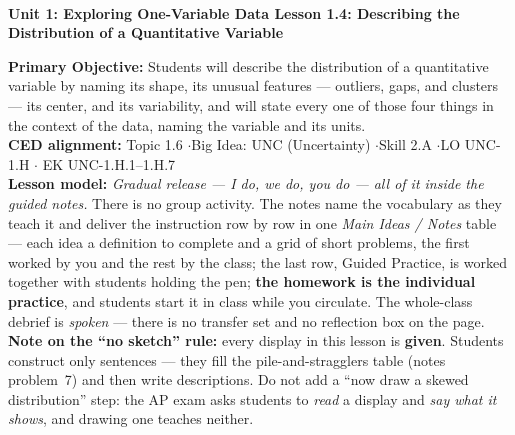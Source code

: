 \documentclass[10pt]{article}
\newcommand{\UnitNumberName}{Unit 1: Exploring One-Variable Data \quad}
\newcommand{\LessonNumberName}{Lesson 1.4: Describing the Distribution of a Quantitative Variable}
\begin{document}
\begin{center}
    {\Large\bfseries \CourseName \\
    {\small\bfseries \UnitNumberName \LessonNumberName}}
\end{center}

\begin{tcolorbox}[colback=sky, colframe=navy, boxrule=0.9pt, arc=2mm,
    left=2mm, right=2mm, top=1.5mm, bottom=1.5mm]
    \textbf{Primary Objective:} Students will describe the distribution of a quantitative
    variable by naming its shape, its unusual features --- outliers, gaps, and clusters ---
    its center, and its variability, and will state every one of those four things in the
    context of the data, naming the variable and its units.
    \\[2pt]
    \textbf{CED alignment:} Topic 1.6 \quad$\cdot$\quad Big Idea: UNC (Uncertainty)
    \quad$\cdot$\quad Skill 2.A \quad$\cdot$\quad LO UNC-1.H \quad$\cdot$\quad
    EK UNC-1.H.1--1.H.7
    \\[2pt]
    \textbf{Lesson model:} \emph{Gradual release --- I do, we do, you do --- all of it inside
    the guided notes.} There is no group activity. The notes name the vocabulary as they teach
    it and deliver the instruction row by row in one \emph{Main Ideas / Notes} table --- each
    idea a definition to complete and a grid of short problems, the first worked by you and the
    rest by the class; the last row, Guided Practice, is worked together with students holding
    the pen; \textbf{the homework is the individual practice}, and students
    start it in class while you circulate. The whole-class debrief is \emph{spoken} ---
    there is no transfer set and no reflection box on the page.
    \\[2pt]
    \textbf{Note on the ``no sketch'' rule:} every display in this lesson is \textbf{given}.
    Students construct only sentences --- they fill the pile-and-stragglers table (notes
    problem~7) and then write descriptions. Do not add a ``now draw a skewed
    distribution'' step: the AP exam asks students to \emph{read} a display and \emph{say what
    it shows}, and drawing one teaches neither.
\end{tcolorbox}
\end{document}
